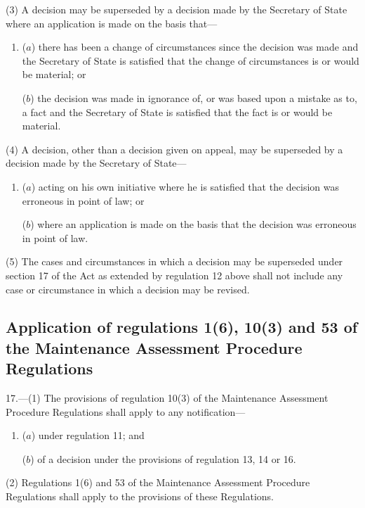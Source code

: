 \documentclass[12pt,a4paper]{article}
\begin{document}
{(3) A decision may be superseded by a decision made by the Secretary of State where an application is made on the basis that—
\begin{enumerate}\item[]
($a$) there has been a change of circumstances since the decision was made and the Secretary of State is satisfied that the change of circumstances is or would be material; or

($b$) the decision was made in ignorance of, or was based upon a mistake as to, a fact and the Secretary of State is satisfied that the fact is or would be material.
\end{enumerate}

(4) A decision, other than a decision given on appeal, may be superseded by a decision made by the Secretary of State—
\begin{enumerate}\item[]
($a$) acting on his own initiative where he is satisfied that the decision was erroneous in point of law; or

($b$) where an application is made on the basis that the decision was erroneous in point of law.
\end{enumerate}

(5) The cases and circumstances in which a decision may be superseded under section 17 of the Act as extended by regulation 12 above shall not include any case or circumstance in which a decision may be revised.


\subsection[17. Application of regulations 1(6), 10(3) and 53 of the Maintenance Assessment Procedure Regulations]{Application of regulations 1(6), 10(3) and 53 of the Maintenance Assessment Procedure Regulations}

17.—(1) The provisions of regulation 10(3) of the Maintenance Assessment Procedure Regulations shall apply to any notification—
\begin{enumerate}\item[]
($a$) under regulation 11; and

($b$) of a decision under the provisions of regulation 13, 14 or 16.
\end{enumerate}

(2) Regulations 1(6) and 53 of the Maintenance Assessment Procedure Regulations shall apply to the provisions of these Regulations.

}
\end{document}
